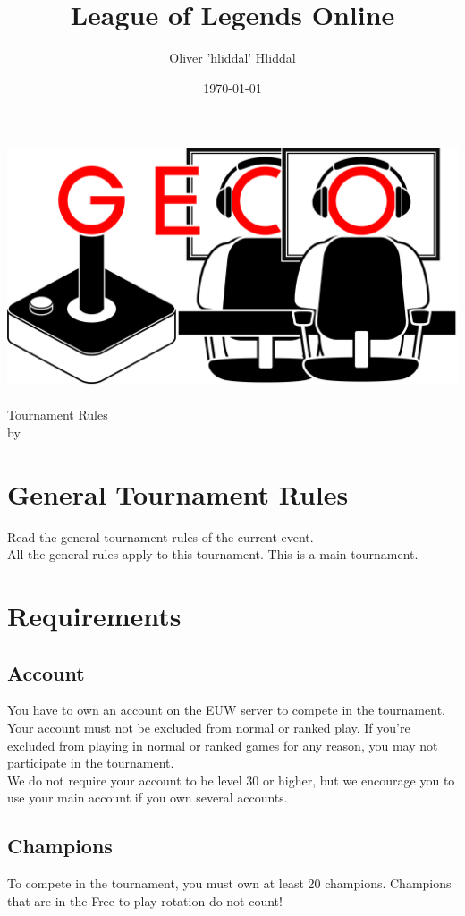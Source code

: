 \documentclass{article}
\title{League of Legends Online}
\author{Oliver 'hliddal' Hliddal}
\date{\today}
\begin{document}
\makeatletter
\begin{titlepage}
\centering
\includegraphics[scale=0.075]{img/GECo.png}\\
\LARGE \@title\\ Tournament Rules\\ \normalsize by \@author\\ \@date
\end{titlepage}
\makeatother


\clearpage

\tableofcontents
\clearpage

\section{General Tournament Rules}
Read the general tournament rules of the current event.\\
All the general rules apply to this tournament. This is a main tournament.

\section{Requirements}
\subsection{Account}
You have to own an account on the EUW server to compete in the tournament.
\\
Your account must not be excluded from normal or ranked play. If you're excluded from playing in normal or ranked games for any reason, you may not participate in the tournament.
\\
We do not require your account to be level 30 or higher, but we encourage you to use your main account if you own several accounts.

\subsection{Champions}
To compete in the tournament, you must own at least 20 champions. Champions that are in the Free-to-play rotation do not count!
\end{document}
